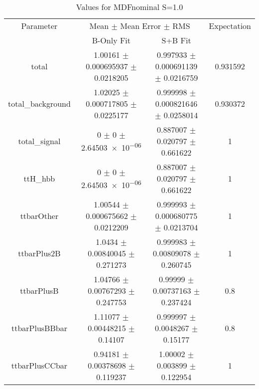 \begin{table}
\centering
\caption{Values for MDFnominal S=1.0}
\begin{tabular}{cccc}
\toprule
Parameter & \multicolumn{2}{c}{Mean $\pm$ Mean Error $\pm$ RMS} & Expectation\\
 & B-Only Fit & S+B Fit & \\
\midrule
total & \num{1.00161} $\pm$ \num{0.000695937} $\pm$ \num{0.0218205} & \num{0.997933} $\pm$ \num{0.000691139} $\pm$ \num{0.0216759} & \num{0.931592}\\
total\_background & \num{1.02025} $\pm$ \num{0.000717805} $\pm$ \num{0.0225177} & \num{0.999998} $\pm$ \num{0.000821646} $\pm$ \num{0.0258014} & \num{0.930372}\\
total\_signal & \num{0} $\pm$ \num{0} $\pm$ \num{2.64503e-06} & \num{0.887007} $\pm$ \num{0.020797} $\pm$ \num{0.661622} & \num{1}\\
ttH\_hbb & \num{0} $\pm$ \num{0} $\pm$ \num{2.64503e-06} & \num{0.887007} $\pm$ \num{0.020797} $\pm$ \num{0.661622} & \num{1}\\
ttbarOther & \num{1.00544} $\pm$ \num{0.000675662} $\pm$ \num{0.0212209} & \num{0.999993} $\pm$ \num{0.000680775} $\pm$ \num{0.0213704} & \num{1}\\
ttbarPlus2B & \num{1.0434} $\pm$ \num{0.00840045} $\pm$ \num{0.271273} & \num{0.999983} $\pm$ \num{0.00809078} $\pm$ \num{0.260745} & \num{1}\\
ttbarPlusB & \num{1.04766} $\pm$ \num{0.00767293} $\pm$ \num{0.247753} & \num{0.99999} $\pm$ \num{0.00737163} $\pm$ \num{0.237424} & \num{0.8}\\
ttbarPlusBBbar & \num{1.11077} $\pm$ \num{0.00448215} $\pm$ \num{0.14107} & \num{0.999997} $\pm$ \num{0.0048267} $\pm$ \num{0.15177} & \num{0.8}\\
ttbarPlusCCbar & \num{0.94181} $\pm$ \num{0.00378698} $\pm$ \num{0.119237} & \num{1.00002} $\pm$ \num{0.003899} $\pm$ \num{0.122954} & \num{1}\\
\bottomrule
\end{tabular}
\end{table}